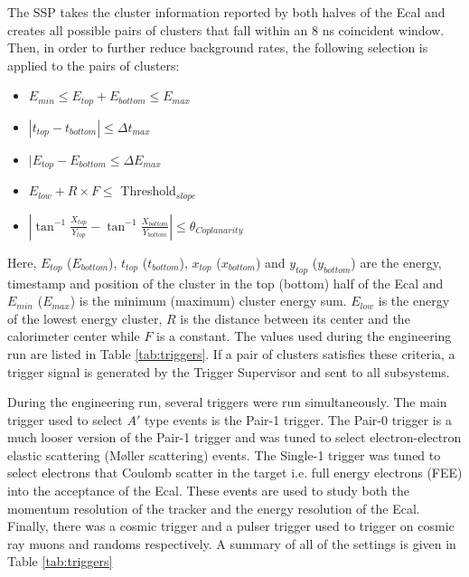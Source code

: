 The SSP takes the cluster information reported by both halves of the Ecal and
creates all possible pairs of clusters that fall within an 8 ns coincident
window.  Then, in order to further reduce background rates, the following 
selection is applied to the pairs of clusters: 
\begin{itemize}
    \item $E_{min} \le E_{top} + E_{bottom} \le E_{max}$
    \item $| t_{top} - t_{bottom} | \le \Delta t_{max}$
    \item $|E_{top} - E_{bottom} \le \Delta E_{max}$
    \item $E_{low} + R \times  F \le$ Threshold$_{slope}$
    \item $|\tan^{-1}\frac{X_{top}}{Y_{top}} - \tan^{-1}\frac{X_{bottom}}{Y_{bottom}}| \le \theta_{Coplanarity}$
\end{itemize}
Here, $E_{top}$ ($E_{bottom}$), $t_{top}$ ($t_{bottom}$), $x_{top}$ 
($x_{bottom}$) and $y_{top}$ ($y_{bottom}$) are the energy, timestamp and 
position of the cluster in the top (bottom) half of the Ecal and $E_{min}$ 
($E_{max}$) is the minimum (maximum) cluster energy sum. $E_{low}$ is the 
energy of the lowest energy cluster, $R$ is the distance between its 
center and the calorimeter center while $F$ is a constant.
The values used during the engineering run are 
listed in Table \ref{tab:triggers}. If a pair of clusters
satisfies these criteria, a trigger signal is generated by the Trigger Supervisor
and sent to all subsystems. 

During the engineering run, several triggers were run simultaneously.  The main
trigger used to select $A'$ type events is the Pair-1 trigger.  The Pair-0 
trigger is a much looser version of the Pair-1 trigger and was tuned to select 
electron-electron elastic scattering (M\o ller scattering) events.  The Single-1 trigger was tuned to select electrons
that Coulomb scatter in the target i.e. full energy electrons (FEE) into the 
acceptance of the Ecal.  These events are used to study both the momentum 
resolution of the tracker and the energy resolution of the Ecal.  Finally, 
there was a cosmic trigger and a pulser trigger used to trigger on cosmic ray
muons and randoms respectively.  A summary of all of the settings is given
in Table \ref{tab:triggers}

